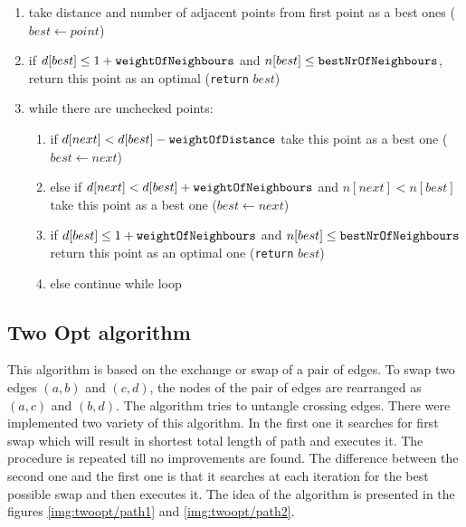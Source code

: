 \documentclass[titlepage]{article}
\begin{document}
\begin{enumerate}
	\item take distance and number of adjacent points from first point as a best ones ($best \leftarrow point$)
	\item if $d[best] \leq 1 + \mbox{\texttt{weightOfNeighbours}}$ and $n[best] \leq \mbox{\texttt{bestNrOfNeighbours}}$, return this point as an optimal (\texttt{return} $best$)
	\item while there are unchecked points:
	
	\begin{enumerate}[label*=\arabic*.]
		\item if $d[next] < d[best] - \mbox{\texttt{weightOfDistance}}$ take this point as a best one ($best \leftarrow next$)
		\item else if $d[next] < d[best] + \mbox{\texttt{weightOfNeighbours}}$ and $n[next] < n[best]$ take this point as a best one ($best \leftarrow next$)
		\item if $d[best] \leq 1 + \mbox{\texttt{weightOfNeighbours}}$ and $n[best] \leq \mbox{\texttt{bestNrOfNeighbours}}$ return this point as an optimal one (\texttt{return} $best$)
		\item else continue while loop
	\end{enumerate}
\end{enumerate}


\subsection{Two Opt algorithm}

This algorithm is based on the exchange or swap of a pair of edges. To swap two edges $(a, b)$ and $(c, d)$, the nodes of the pair of edges are rearranged as $(a, c)$ and $(b, d)$. The algorithm tries to untangle crossing edges. There were implemented two variety of this algorithm. In the first one it searches for first swap which will result in shortest total length of path and executes it. The procedure is repeated till no improvements are found. The difference between the second one and the first one is that it searches at each iteration for the best possible swap and then executes it. The idea of the algorithm is presented in the figures \ref{img:twoopt/path1} and \ref{img:twoopt/path2}.
\end{document}
